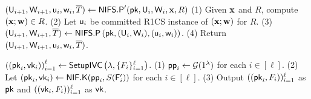 \def\hp{\hspace*{0.1in}}
\begin{small}
\begin{algorithm}[bt]
$ (\mathsf{U}_{i+1}, \mathsf{W}_{i+1}, \mathsf{u}_{i}, \mathsf{w}_{i}, \overline{{T}}) \leftarrow \mathsf{NIFS.P}'(\mathsf{pk}, \mathsf{U}_i, \mathsf{W}_i, {{\mathbf {x}}}, R)$ \newline
	(1) Given ${{\mathbf {x}}}$ and $R$, compute $({{\mathbf {x}}}; {{\mathbf {w}}}) \in R$. \newline
	(2) Let $\mathsf{u}_{i}$ be committed R1CS instance of $({{\mathbf {x}}}; {{\mathbf {w}}})$
		for $R$. \newline
	(3) $(\mathsf{U}_{i+1}, \mathsf{W}_{i+1}, \overline{{T}})  \leftarrow \mathsf{NIFS.P}\left(\mathsf{pk}, (\mathsf{U}_i, \mathsf{W}_i),
		(\mathsf{u}_i, \mathsf{w}_i)\right)$. \newline
	(4) Return $(\mathsf{U}_{i+1}, \mathsf{W}_{i+1}, \mathsf{u}_i, \mathsf{w}_i, \overline{{T}})$.
\newline

$ \left( (\mathsf{pk}_i, \mathsf{vk}_i) \right)_{i=1}^{\ell} \leftarrow \mathsf{SetupIVC}\left(\lambda, \{F_i\}_{i=1}^\ell \right)$. \cite[pp. 17]{SuperNova}\newline
(1) $\mathsf{pp}_i \leftarrow \mathcal G(1^\lambda)$ for each $i \in [\ell]$. \newline
(2) Let $(\mathsf{pk}_i, \mathsf{vk}_i)  \leftarrow \mathsf{NIF.K}(\mathsf{pp}_i, S(\mathsf{F}_{i}'))$ for
	each $i \in [\ell]$. \newline
(3) Output $( (\mathsf{pk}_i, F_i) )_{i=1}^{\ell}$ as $\mathsf{pk}$ and
	$ ( (\mathsf{vk}_i, F_i) )_{i=1}^{\ell}$ as $\mathsf{vk}$.


\end{algorithm}
\end{small}
